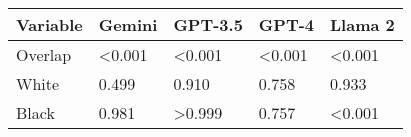 
\begin{tabular}{lllll}
\toprule
Variable & Gemini & GPT-3.5 & GPT-4 & Llama 2\\
\midrule
Overlap & <0.001 & <0.001 & <0.001 & <0.001\\
White & 0.499 & 0.910 & 0.758 & 0.933\\
Black & 0.981 & >0.999 & 0.757 & <0.001\\
\bottomrule
\end{tabular}

